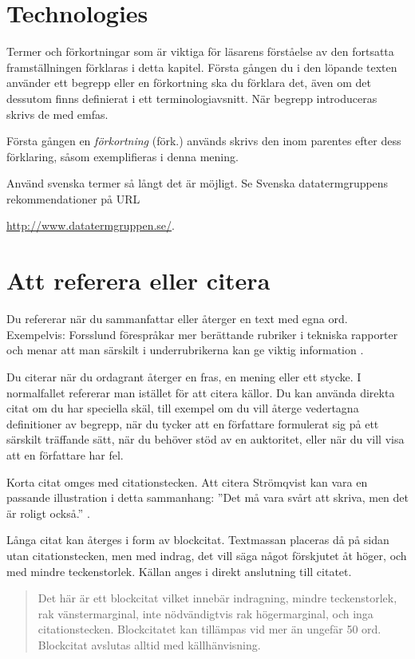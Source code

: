 \section{Technologies}
\label{sec:technologies}
\noindent

Termer och förkortningar som är viktiga för läsarens förståelse av den 
fortsatta framställningen förklaras i detta kapitel.
Första gången du i den löpande texten använder ett begrepp eller en förkortning 
ska du förklara det, även om det dessutom finns definierat i ett 
terminologiavsnitt.
När begrepp introduceras skrivs de med emfas.

Första gången en \emph{förkortning} (förk.) används skrivs den inom parentes 
efter dess förklaring, såsom exemplifieras i denna mening.

Använd svenska termer så långt det är möjligt.
Se Svenska datatermgruppens \citep{Datatermgruppen} rekommendationer på URL
\begin{center}
	\url{http://www.datatermgruppen.se/}.
\end{center}


\section{Att referera eller citera}
\label{sec:ref}
\noindent
Du refererar när du sammanfattar eller återger en text med egna ord.
Exempelvis:
Forsslund förespråkar mer berättande rubriker i tekniska rapporter och menar 
att man särskilt i underrubrikerna kan ge viktig information 
\citep{Forsslund1969raf}.

Du citerar när du ordagrant återger en fras, en mening eller ett stycke.
I normalfallet refererar man istället för att citera källor.
Du kan använda direkta citat om du har speciella skäl, till exempel om du vill 
återge vedertagna definitioner av begrepp, när du tycker att en författare 
formulerat sig på ett särskilt träffande sätt, när du behöver stöd av en 
auktoritet, eller när du vill visa att en författare har fel.

Korta citat omges med citationstecken.
Att citera Strömqvist kan vara en passande illustration i detta sammanhang:
''Det må vara svårt att skriva, men det är roligt också.'' \citep[sidan 
X]{Stromquist2000s}.

Långa citat kan återges i form av blockcitat.
Textmassan placeras då på sidan utan citationstecken, men med indrag, det vill 
säga något förskjutet åt höger, och med mindre teckenstorlek.
Källan anges i direkt anslutning till citatet.
\begin{quote}
	Det här är ett blockcitat vilket innebär indragning, mindre teckenstorlek, 
	rak vänstermarginal, inte nödvändigtvis rak högermarginal, och inga 
	citationstecken.
	Blockcitatet kan tillämpas vid mer än ungefär 50 ord.  Blockcitat avslutas 
	alltid med källhänvisning. \citep[sidan X]{Stromquist2000s}
\end{quote}


